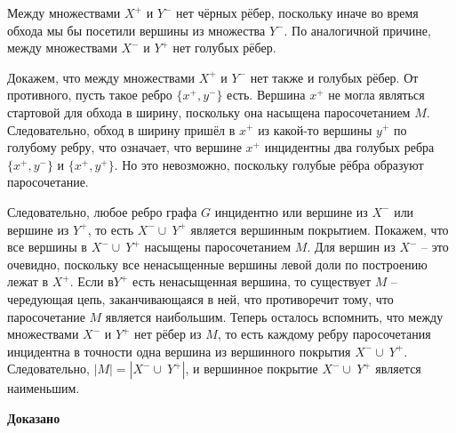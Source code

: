 \documentclass[a4paper,12pt]{article} %
\begin{document}
Между множествами $X^{+}$ и $ Y^{-}$ нет чёрных рёбер, поскольку иначе во время обхода мы бы посетили вершины из множества $Y^{-}$. По аналогичной причине, между множествами $X^{-}$ и $Y^{+}$ нет голубых рёбер.

Докажем, что между множествами $ X^{+}$ и $Y^{-}$ нет также и голубых рёбер. От противного, пусть такое ребро $\{x^{+},y^{-}\}$ есть. Вершина $x^{+}$ не могла являться стартовой для обхода в ширину, поскольку она насыщена паросочетанием $M$. Следовательно, обход в ширину пришёл в $x^{+}$ из какой-то вершины $y^{+}$ по голубому ребру, что означает, что вершине $x^{+}$ инцидентны два голубых ребра $\{x^{+},y^{-}\}$ и $\{x^{+},y^{+}\}$. Но это невозможно, поскольку голубые рёбра образуют паросочетание.

Следовательно, любое ребро графа $G$ инцидентно или вершине из $X^{-}$ или вершине из $Y^{+}$, то есть $X^{-}\cup \ Y^{+}$ является вершинным покрытием. Покажем, что все вершины в $X^{-}\cup \ Y^{+}$ насыщены паросочетанием $M$. Для вершин из $X^{-}$ -- это очевидно, поскольку все ненасыщенные вершины левой доли по построению лежат в $X^{+}$. Если в$Y^{+}$ есть ненасыщенная вершина, то существует $M$ --чередующая цепь, заканчивающаяся в ней, что противоречит тому, что паросочетание $M$ является наибольшим. Теперь осталось вспомнить, что между множествами $X^{-}$ и $Y^{+}$ нет рёбер из $M$, то есть каждому ребру паросочетания инцидентна в точности одна вершина из вершинного покрытия $ X^{-}\cup \ Y^{+}$. Следовательно, $|M|=|X^{-}\cup \ Y^{+}|$, и вершинное покрытие $X^{-}\cup \ Y^{+}$ является наименьшим.



\begin{flushright}
\begin{large}
\textbf {Доказано }
\end{large}
\end{flushright}
\end{document}
